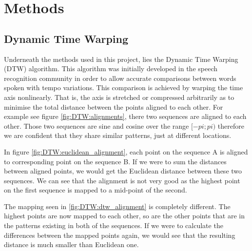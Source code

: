 \documentclass[parskip]{cs4rep}
\begin{document}

\chapter{Methods}
\section{Dynamic Time Warping}
Underneath the methods used in this project, lies the Dynamic Time Warping (DTW) algorithm. This algorithm was initially developed in the speech recognition community in order to allow accurate comparisons between words spoken with tempo variations. 
This comparison is achieved by warping the time axis nonlinearly. That is, the axis is stretched or compressed arbitrarily as to minimise the total distance between the points aligned to each other. For example see figure \ref{fig:DTW:alignments}, there two sequences are aligned to each other. Those two sequences are sine and cosine over the range $[-pi; pi)$ therefore we are confident that they share similar patterns, just at different locations.

In figure \ref{fig:DTW:euclidean_alignment}, each point on the sequence A is aligned to corresponding point on the sequence B. If we were to sum the distances between aligned points, we would get the Euclidean distance between these two sequences. We can see that the alignment is not very good as the highest point on the first sequence is mapped to a mid-point of the second.

The mapping seen in \ref{fig:DTW:dtw_alignment} is completely different. The highest points are now mapped to each other, so are the other points that are in the patterns existing in both of the sequences. If we were to calculate the differences between the mapped points again, we would see that the resulting distance is much smaller than Euclidean one.
\end{document}
